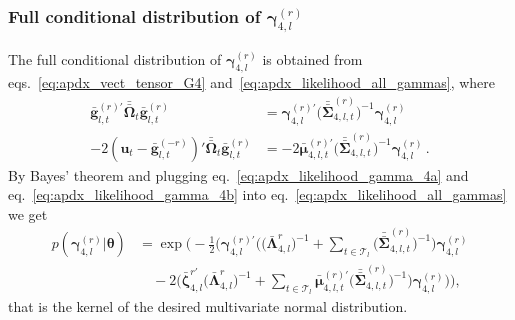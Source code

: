 \documentclass[12pt,a4paper]{article}
\theoremstyle{custom}
\begin{document}
\subsubsection{Full conditional distribution of $\boldsymbol{\gamma}_{4,l}^{(r)}$}
The full conditional distribution of $\boldsymbol{\gamma}_{4,l}^{(r)}$ is obtained from eqs.~\eqref{eq:apdx_vect_tensor_G4} and~\eqref{eq:apdx_likelihood_all_gammas}, where
\begin{align}
\label{eq:apdx_likelihood_gamma_4a}
\bar{\mathbf{g}}_{l,t}^{(r)\prime} \bar{\bar{\boldsymbol{\Omega}}}_t \bar{\mathbf{g}}_{l,t}^{(r)} & = \boldsymbol{\gamma}_{4,l}^{(r)\prime} \Big( \bar{\bar{\boldsymbol{\Sigma}}}_{4,l,t}^{(r)} \Big)^{-1} \boldsymbol{\gamma}_{4,l}^{(r)} \\
-2 (\mathbf{u}_t - \bar{\mathbf{g}}_{l,t}^{(-r)})' \bar{\bar{\boldsymbol{\Omega}}}_t \bar{\mathbf{g}}_{l,t}^{(r)} & = -2 \bar{\boldsymbol{\mu}}_{4,l,t}^{(r)\prime} \Big( \bar{\bar{\boldsymbol{\Sigma}}}_{4,l,t}^{(r)} \Big)^{-1} \boldsymbol{\gamma}_{4,l}^{(r)} \, .
\label{eq:apdx_likelihood_gamma_4b}
\end{align}
By Bayes' theorem and plugging eq.~\eqref{eq:apdx_likelihood_gamma_4a} and eq.~\eqref{eq:apdx_likelihood_gamma_4b} into eq.~\eqref{eq:apdx_likelihood_all_gammas} we get
\begin{align*}
p(\boldsymbol{\gamma}_{4,l}^{(r)} | \boldsymbol{\theta}) 
 & = \exp \Bigg( -\frac{1}{2} \Bigg( \boldsymbol{\gamma}_{4,l}^{(r)\prime} \Big( \Big( \bar{\boldsymbol{\Lambda}}_{4,l}^{r} \Big)^{-1} + \sum_{t\in\mathcal{T}_l} \Big(  \bar{\bar{\boldsymbol{\Sigma}}}_{4,l,t}^{(r)} \Big)^{-1} \Big) \boldsymbol{\gamma}_{4,l}^{(r)} \\ 
 & \quad -2 \Big( \bar{\boldsymbol{\zeta}}_{4,l}^{r'} \Big( \bar{\boldsymbol{\Lambda}}_{4,l}^{r} \Big)^{-1} + \sum_{t\in\mathcal{T}_l} \bar{\boldsymbol{\mu}}_{4,l,t}^{(r)\prime} \Big( \bar{\bar{\boldsymbol{\Sigma}}}_{4,l,t}^{(r)} \Big)^{-1} \Big) \boldsymbol{\gamma}_{4,l}^{(r)} \Bigg) \Bigg),
\end{align*}
that is the kernel of the desired multivariate normal distribution.
\end{document}
